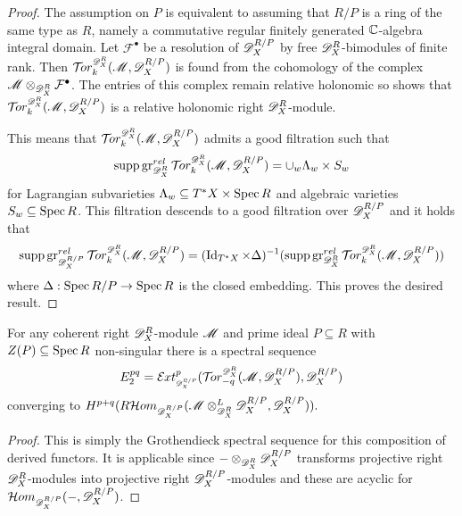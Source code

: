  \begin{proof}
   The assumption on $P$ is equivalent to assuming that $R/P$ is a ring of the same type as $R$, namely a commutative regular finitely generated $\mathbb{C}$-algebra integral domain.
   Let $\mathcal{F}^\bullet$ be a resolution of $\mathscr{D}_X^{R/P}$ by free $\mathscr{D}_X^R$-bimodules of finite rank.
   Then $\Tr{\D_X^R}{k}(\M, \allowbreak\D_X^{R/P})$ is found from the cohomology of the complex $\mathscr{M}\otimes_{\mathscr{D}_X^R}\mathcal{F}^{\bullet}$.
   The entries of this complex remain relative holonomic so
    shows that $\Tr{\D_X^R}{k}(\M,\D_X^{R/P})$ is a relative holonomic right $\mathscr{D}_X^R$-module.

   This means that $\Tr{\D_X^R}{k}(\M,\D_X^{R/P})$ admits a good filtration such that $$\supp \gr_{\D_X^R}^{rel}\Tr{\D_X^R}{k}(\M,\D_X^{R/P}) = \cup_w \Lambda_w \times S_w $$
   for Lagrangian subvarieties $\Lambda_w\subseteq T^*X\times \operatorname{Spec} R$ and algebraic varieties $S_w \subseteq \operatorname{Spec} R$.
   This filtration descends to a good filtration over $\mathscr{D}_X^{R/P}$ and it holds that
   $$\supp \gr_{\D_X^{R/P}}^{rel} \Tr{\D_X^R}{k}(\M,\D_X^{R/P}) = (\Id_{T^*X}\times \Delta)^{-1}(\supp \gr_{\D_X^R}^{rel}\Tr{\D_X^R}{k}(\M,\D_X^{R/P}))$$
   where $\Delta: \operatorname{Spec} R/P\to \operatorname{Spec} R$ is the closed embedding.
   This proves the desired result.
 \end{proof}
 \begin{proposition}
   For any coherent right $\mathscr{D}_X^R$-module $\mathscr{M}$ and prime ideal $P\subseteq R$ with $Z(P)\subseteq \operatorname{Spec} R$ non-singular there is a spectral sequence
  $$E_2^{pq}= \Ex{\D_X^{R/P}}{p}(\Tr{\D_X^R}{-q}(\M,\D_X^{R/P}), \D_X^{R/P}) $$
  converging to $H^{p+q}(R\mathcal{H}om_{\mathscr{D}_X^{R/P}}(\mathscr{M}\otimes_{\mathscr{D}_X^R}^L \mathscr{D}_X^{R/P},\mathscr{D}_X^{R/P})).$
 \end{proposition}
 \begin{proof}
   This is simply the Grothendieck spectral sequence  for this composition of derived functors.
   It is applicable since ${-} \otimes_{\mathscr{D}_X^{R}}\mathscr{D}_X^{R/P}$ transforms projective right $\mathscr{D}_X^R$-modules into projective right $\mathscr{D}_X^{R/P}$-modules and these are acyclic for $\mathcal{H}om_{\mathscr{D}_X^{R/P}}({-},\mathscr{D}_X^{R/P})$.
 \end{proof}

